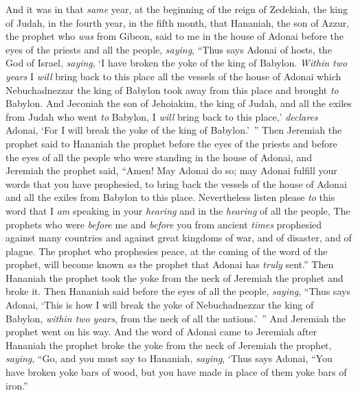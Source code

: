 \begin{biblechapter} %
 And it was in that \textit{same} year, at the beginning of the reign of Zedekiah, the king of Judah, in the fourth year, in the fifth month, that Hananiah, the son of Azzur, the prophet who \textit{was} from Gibeon, said to me in the house of Adonai before the eyes of the priests and all the people, \textit{saying},
\verse “Thus says Adonai of hosts, the God of Israel, \textit{saying}, ‘I have broken the yoke of the king of Babylon.
\verse \textit{Within two years} I \textit{will} bring back to this place all the vessels of the house of Adonai which Nebuchadnezzar the king of Babylon took away from this place and brought \textit{to} Babylon.
\verse And Jeconiah the son of Jehoiakim, the king of Judah, and all the exiles from Judah who went \textit{to} Babylon, I \textit{will} bring back to this place,’ \textit{declares} Adonai, ‘For I will break the yoke of the king of Babylon.’ ”
\verse Then Jeremiah the prophet said to Hananiah the prophet before the eyes of the priests and before the eyes of all the people who were standing in the house of Adonai,
\verse and Jeremiah the prophet said, “Amen! May Adonai do so; may Adonai fulfill your words that you have prophesied, to bring back the vessels of the house of Adonai and all the exiles from Babylon to this place.
\verse Nevertheless listen please \textit{to} this word that I \textit{am} speaking in your \textit{hearing} and in the \textit{hearing} of all the people,
\verse The prophets who were \textit{before} me and \textit{before} you from ancient \textit{times} prophesied against many countries and against great kingdoms of war, and of disaster, and of plague.
\verse The prophet who prophesies peace, at the coming of the word of the prophet, will become known \textit{as} the prophet that Adonai has \textit{truly} sent.”
\verse Then Hananiah the prophet took the yoke from the neck of Jeremiah the prophet and broke it.
\verse Then Hananiah said before the eyes of all the people, \textit{saying}, “Thus says Adonai, ‘This is how I will break the yoke of Nebuchadnezzar the king of Babylon, \textit{within two years}, from the neck of all the nations.’ ” And Jeremiah the prophet went on his way.
\verse And the word of Adonai came to Jeremiah after Hananiah the prophet broke the yoke from the neck of Jeremiah the prophet, \textit{saying},
\verse “Go, and you must say to Hananiah, \textit{saying}, ‘Thus says Adonai, “You have broken yoke bars of wood, but you have made in place of them yoke bars of iron.”

\end{biblechapter}
